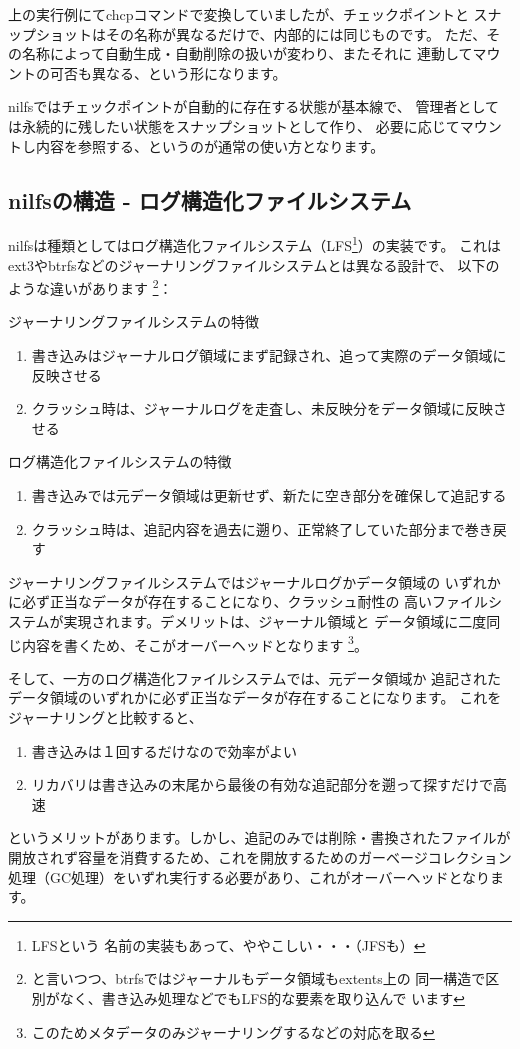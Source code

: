 \documentclass[mingoth,a4paper]{jsarticle}
\begin{document}
上の実行例にてchcpコマンドで変換していましたが、チェックポイントと
スナップショットはその名称が異なるだけで、内部的には同じものです。
ただ、その名称によって自動生成・自動削除の扱いが変わり、またそれに
連動してマウントの可否も異なる、という形になります。

nilfsではチェックポイントが自動的に存在する状態が基本線で、
管理者としては永続的に残したい状態をスナップショットとして作り、
必要に応じてマウントし内容を参照する、というのが通常の使い方となります。

\subsection{nilfsの構造 - ログ構造化ファイルシステム}
nilfsは種類としてはログ構造化ファイルシステム（LFS\footnote{LFSという
名前の実装もあって、ややこしい・・・（JFSも）}）の実装です。
これはext3やbtrfsなどのジャーナリングファイルシステムとは異なる設計で、
以下のような違いがあります
\footnote{と言いつつ、btrfsではジャーナルもデータ領域もextents上の
同一構造で区別がなく、書き込み処理などでもLFS的な要素を取り込んで
います\cite{nilbtrfmt}}：
\begin{itembox}[l]{ジャーナリングファイルシステムの特徴}
\begin{enumerate}
\item
書き込みはジャーナルログ領域にまず記録され、追って実際のデータ領域に反映させる
\item
クラッシュ時は、ジャーナルログを走査し、未反映分をデータ領域に反映させる
\end{enumerate}
\end{itembox}

\begin{itembox}[l]{ログ構造化ファイルシステムの特徴}
\begin{enumerate}
\item 書き込みでは元データ領域は更新せず、新たに空き部分を確保して追記する
\item クラッシュ時は、追記内容を過去に遡り、正常終了していた部分まで巻き戻す
\end{enumerate}
\end{itembox}

ジャーナリングファイルシステムではジャーナルログかデータ領域の
いずれかに必ず正当なデータが存在することになり、クラッシュ耐性の
高いファイルシステムが実現されます。デメリットは、ジャーナル領域と
データ領域に二度同じ内容を書くため、そこがオーバーヘッドとなります
\footnote{このためメタデータのみジャーナリングするなどの対応を取る}。

そして、一方のログ構造化ファイルシステムでは、元データ領域か
追記されたデータ領域のいずれかに必ず正当なデータが存在することになります。
これをジャーナリングと比較すると、
\begin{enumerate}
\item 書き込みは１回するだけなので効率がよい
\item リカバリは書き込みの末尾から最後の有効な追記部分を遡って探すだけで高速
\end{enumerate}
というメリットがあります。しかし、追記のみでは削除・書換されたファイルが
開放されず容量を消費するため、これを開放するためのガーベージコレクション
処理（GC処理）をいずれ実行する必要があり、これがオーバーヘッドとなります。
\end{document}
